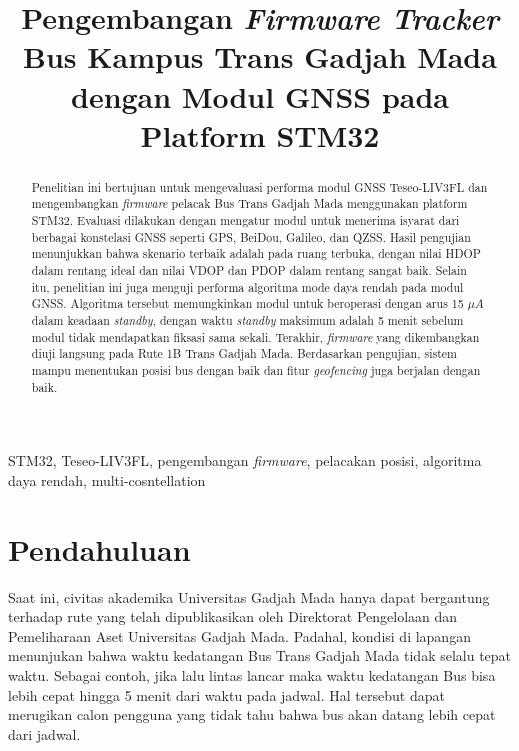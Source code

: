 \documentclass[conference]{IEEEtran}
\begin{document}
\title{Pengembangan \textit{Firmware Tracker} Bus Kampus Trans Gadjah Mada dengan Modul GNSS pada Platform STM32}

\author{
}

\maketitle

\begin{abstract}
	Penelitian ini bertujuan untuk mengevaluasi performa modul GNSS Teseo-LIV3FL dan mengembangkan \textit{firmware} pelacak Bus Trans Gadjah Mada menggunakan platform STM32. Evaluasi dilakukan dengan mengatur modul untuk menerima isyarat dari berbagai konstelasi GNSS seperti GPS, BeiDou, Galileo, dan QZSS. Hasil pengujian menunjukkan bahwa skenario terbaik adalah pada ruang terbuka, dengan nilai HDOP dalam rentang ideal dan nilai VDOP dan PDOP dalam rentang sangat baik. Selain itu, penelitian ini juga menguji performa algoritma mode daya rendah pada modul GNSS. Algoritma tersebut memungkinkan modul untuk beroperasi dengan arus 15 $\mu A$ dalam keadaan \textit{standby}, dengan waktu \textit{standby} maksimum adalah 5 menit sebelum modul tidak mendapatkan fiksasi sama sekali. Terakhir, \textit{firmware} yang dikembangkan diuji langsung pada Rute 1B Trans Gadjah Mada. Berdasarkan pengujian, sistem mampu menentukan posisi bus dengan baik dan fitur \textit{geofencing} juga berjalan dengan baik.
\end{abstract}

\begin{IEEEkeywords}
STM32, Teseo-LIV3FL, pengembangan \textit{firmware}, pelacakan posisi, algoritma daya rendah, multi-cosntellation
\end{IEEEkeywords}

\section{Pendahuluan}
Saat ini, civitas akademika Universitas Gadjah Mada hanya dapat bergantung terhadap rute yang telah dipublikasikan oleh Direktorat Pengelolaan dan Pemeliharaan Aset Universitas Gadjah Mada. Padahal, kondisi di lapangan menunjukan bahwa waktu kedatangan Bus Trans Gadjah Mada tidak selalu tepat waktu. Sebagai contoh, jika lalu lintas lancar maka waktu kedatangan Bus bisa lebih cepat hingga 5 menit dari waktu pada jadwal. Hal tersebut dapat merugikan calon pengguna yang tidak tahu bahwa bus akan datang lebih cepat dari jadwal.
\end{document}

